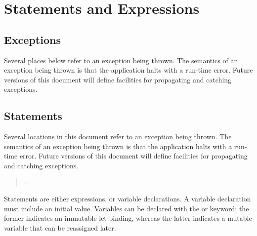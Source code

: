 \section{Statements and Expressions}

\subsection{Exceptions}

Several places below  refer to an exception being thrown.
The semantics of an exception being thrown is that the application
halts with a run-time error.  Future versions of this document will
define facilities for propagating and catching exceptions.


\subsection{Statements}

Several locations in this document refer to an exception being thrown.
The semantics of an exception being thrown is that the application
halts with a run-time error.  Future versions of this document will
define facilities for propagating and catching exceptions.



\begin{quote}

 {}

 {}



 {}   = 



 {}

 {}

\end{quote}

Statements are either expressions, or variable declarations.  A
variable declaration must include an initial value.  Variables can be
declared with the  or  keyword; the former
indicates an immutable let binding, whereas the latter indicates a
mutable variable that can be reassigned later.


